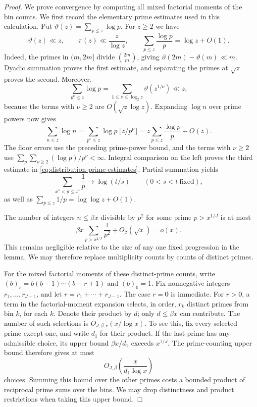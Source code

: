 \begin{proof}
We prove convergence by computing all mixed factorial moments of the
bin counts.  We first record the elementary prime estimates used in this
calculation.  Put $\vartheta(z)=\sum_{p\le z}\log p$.  For $z\ge2$ we have
\begin{equation}\label{eq:distribution-prime-estimates}
 \vartheta(z)\ll z,\qquad
 \pi(z)\ll\frac z{\log z},\qquad
 \sum_{p\le z}\frac{\log p}{p}=\log z+O(1).
\end{equation}
Indeed, the primes in $(m,2m]$ divide $\binom{2m}{m}$, giving
$\vartheta(2m)-\vartheta(m)\ll m$.  Dyadic summation proves the first
estimate, and separating the primes at $\sqrt z$ proves the second.
Moreover,
\[
 \sum_{p^\nu\le z}\log p
 =\sum_{1\le\nu\le\log_2z}\vartheta(z^{1/\nu})\ll z,
\]
because the terms with $\nu\ge2$ are $O(\sqrt z\log z)$.
Expanding $\log n$ over prime powers now gives
\[
 \sum_{n\le z}\log n
 =\sum_{p^\nu\le z}\log p\,\lfloor z/p^\nu\rfloor
 =z\sum_{p\le z}\frac{\log p}{p}+O(z).
\]
The floor errors use the preceding prime-power bound, and the terms
with $\nu\ge2$ use
$\sum_p\sum_{\nu\ge2}(\log p)/p^\nu<\infty$.
Integral comparison on the left proves the third estimate in
\eqref{eq:distribution-prime-estimates}.  Partial summation yields
\begin{equation}\label{eq:distribution-prime-measure}
 \sum_{x^s<p\le x^t}\frac1p\longrightarrow\log(t/s)
 \qquad(0<s<t\ \text{fixed}),
\end{equation}
as well as $\sum_{p\le z}1/p=\log\log z+O(1)$.

The number of integers $n\leq\beta x$ divisible by $p^2$ for some
prime $p>x^{1/J}$ is at most
\[
 \beta x\sum_{p>x^{1/J}}\frac1{p^2}+O_\beta(\sqrt x)=o(x).
\]
This remains negligible relative to the size of any one fixed progression
in the lemma.  We may therefore replace multiplicity counts by counts of
distinct primes.

For the mixed factorial moments of these distinct-prime counts, write
$(b)_r=b(b-1)\cdots(b-r+1)$ and $(b)_0=1$.
Fix nonnegative integers $r_1,\ldots,r_{J-1}$, and let
$r=r_1+\cdots+r_{J-1}$.  The case $r=0$ is immediate.  For $r>0$, a term
in the factorial-moment expansion selects, in order, $r_k$ distinct
primes from bin $k$, for each $k$.  Denote their product by $d$; only
$d\leq\beta x$ can contribute.  The number of such selections is
$O_{J,\beta,r}(x/\log x)$.  To see this, fix every selected prime except
one, and write $d_1$ for their product.  If the last prime has any
admissible choice, its upper bound $\beta x/d_1$ exceeds $x^{1/J}$.
The prime-counting upper bound therefore gives at most
\[
 O_{J,\beta}\!\left(\frac{x}{d_1\log x}\right)
\]
choices.  Summing this bound over the other primes costs a bounded product
of reciprocal prime sums over the bins.  We may drop distinctness and
product restrictions when taking this upper bound.


\end{proof}
